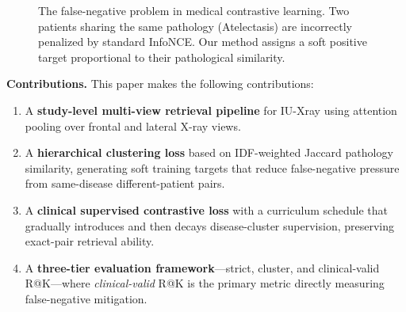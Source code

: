 \documentclass[11pt, a4paper]{article}
\begin{document}
\begin{figure}[H]
  \centering
  \caption{The false-negative problem in medical contrastive learning.
    Two patients sharing the same pathology (Atelectasis) are incorrectly
    penalized by standard InfoNCE. Our method assigns a soft positive target
    proportional to their pathological similarity.}
  \label{fig:false_negative}
\end{figure}

\textbf{Contributions.} This paper makes the following contributions:
\begin{enumerate}[label=(\roman*), leftmargin=2em]
  \item A \textbf{study-level multi-view retrieval pipeline} for IU-Xray
    using attention pooling over frontal and lateral X-ray views.
  \item A \textbf{hierarchical clustering loss} based on IDF-weighted Jaccard
    pathology similarity, generating soft training targets that reduce
    false-negative pressure from same-disease different-patient pairs.
  \item A \textbf{clinical supervised contrastive loss} with a curriculum
    schedule that gradually introduces and then decays disease-cluster
    supervision, preserving exact-pair retrieval ability.
  \item A \textbf{three-tier evaluation framework}---strict, cluster, and
    clinical-valid R@K---where \emph{clinical-valid} R@K is the primary
    metric directly measuring false-negative mitigation.
\end{enumerate}
\end{document}
